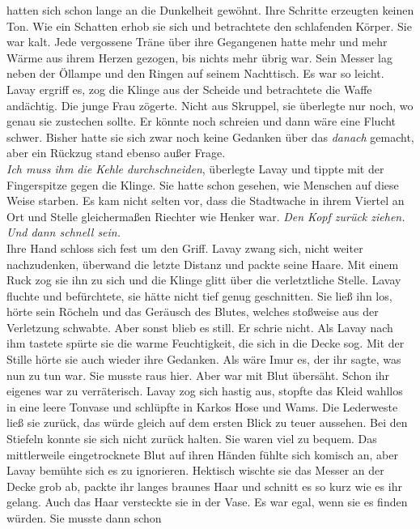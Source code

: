hatten sich schon lange an die Dunkelheit gewöhnt. Ihre Schritte erzeugten keinen Ton. Wie ein 
Schatten erhob sie sich und betrachtete den schlafenden Körper. Sie war kalt. Jede vergossene Träne 
über ihre Gegangenen hatte mehr und mehr Wärme aus ihrem Herzen gezogen, bis nichts mehr übrig 
war. Sein Messer lag neben der Öllampe und den Ringen auf seinem Nachttisch. Es war so leicht.\\
Lavay ergriff es, zog die Klinge aus der Scheide und betrachtete die Waffe andächtig. Die junge 
Frau zögerte. Nicht aus Skruppel, sie überlegte nur noch, wo genau sie zustechen sollte. Er könnte 
noch schreien und dann wäre eine Flucht schwer. Bisher hatte sie sich zwar noch keine Gedanken über 
das \textit{danach} gemacht, aber ein Rückzug stand ebenso außer Frage.\\
\textit{Ich muss ihm die Kehle durchschneiden}, überlegte Lavay und tippte mit der Fingerspitze 
gegen die Klinge. Sie hatte schon gesehen, wie Menschen auf diese Weise starben. Es kam nicht 
selten vor, dass die Stadtwache in ihrem Viertel an Ort und Stelle gleichermaßen Riechter wie Henker 
war. \textit{Den Kopf zurück ziehen. Und dann schnell sein.}\\
Ihre Hand schloss sich fest um den Griff. Lavay zwang sich, nicht weiter nachzudenken, überwand die 
letzte Distanz und packte seine Haare. Mit einem Ruck zog sie ihn zu sich und die Klinge glitt über 
die verletztliche Stelle. Lavay fluchte und befürchtete, sie hätte nicht tief genug geschnitten. 
Sie ließ ihn los, hörte sein Röcheln und das Geräusch des Blutes, welches stoßweise aus der 
Verletzung schwabte. Aber sonst blieb es still. Er schrie nicht. Als Lavay nach ihm tastete spürte 
sie die warme Feuchtigkeit, die sich in die Decke sog. Mit der Stille hörte sie auch wieder ihre 
Gedanken. Als wäre Imur es, der ihr sagte, was nun zu tun war. Sie musste raus hier. Aber war mit 
Blut übersäht. Schon ihr eigenes war zu verräterisch. Lavay zog sich hastig aus, stopfte das Kleid 
wahllos in eine leere Tonvase und schlüpfte in Karkos Hose und Wams. Die Lederweste ließ sie zurück, 
das würde gleich auf dem ersten Blick zu teuer aussehen. Bei den Stiefeln konnte sie sich nicht 
zurück halten. Sie waren viel zu bequem. Das mittlerweile eingetrocknete Blut auf ihren Händen 
fühlte sich komisch an, aber Lavay bemühte sich es zu ignorieren. Hektisch wischte sie das Messer an 
der Decke grob ab, packte ihr langes braunes Haar und schnitt es so kurz wie es ihr gelang. Auch 
das Haar versteckte sie in der Vase. Es war egal, wenn sie es finden würden. Sie musste dann schon 
